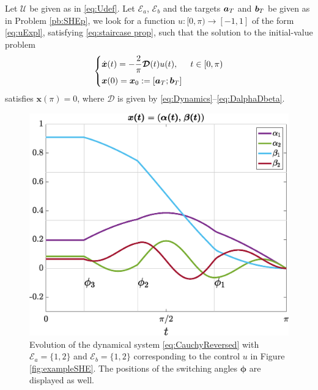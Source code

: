 \documentclass[9pt,shortpaper,twoside,web]{ieeecolor}
\begin{document}
\begin{problem}\label{pb:SHEpControl}
Let $\mathcal{U}$ be given as in \eqref{eq:Udef}. Let $\mathcal{E}_a$, $\mathcal{E}_b$ and the targets $\bm{a}_T$ and $\bm{b}_T$ be given as in Problem \ref{pb:SHEp},  we look for a function $u: [0,\pi)\to [-1,1]$ of the form \eqref{eq:uExpl}, satisfying \eqref{eq:staircase prop}, such that the solution to the initial-value problem
	\begin{equation}\label{eq:CauchyReversed}
		\begin{cases}
			\displaystyle\dot{\bm{x}}(t) = -\frac 2\pi\bm{\mathcal{D}}(t)u(t),  & t \in [0,\pi)
			\\[5pt]
			\bm{x}(0) = \bm{x}_0 := [\bm{a}_T; \bm{b}_T]
		\end{cases}
	\end{equation}
	satisfies $\bm{x} (\pi) = 0$, where $\bm{\mathcal{D}}$ is given by \eqref{eq:Dynamics}--\eqref{eq:DalphaDbeta}.
\end{problem}

\begin{figure}[ht!] 
	\centering
	\includegraphics[scale=0.325]{img/fig02.eps}
	\caption{Evolution of the dynamical system \eqref{eq:CauchyReversed} with $\mathcal{E}_a = \{1,2\}$ and $\mathcal{E}_b = \{1,2\}$ corresponding to the control $u$ in Figure \ref{fig:exampleSHE}. The positions of the switching angles $\bm{\phi}$ are displayed as well.}\label{fig:evolution_x}
\end{figure}
\end{document}
